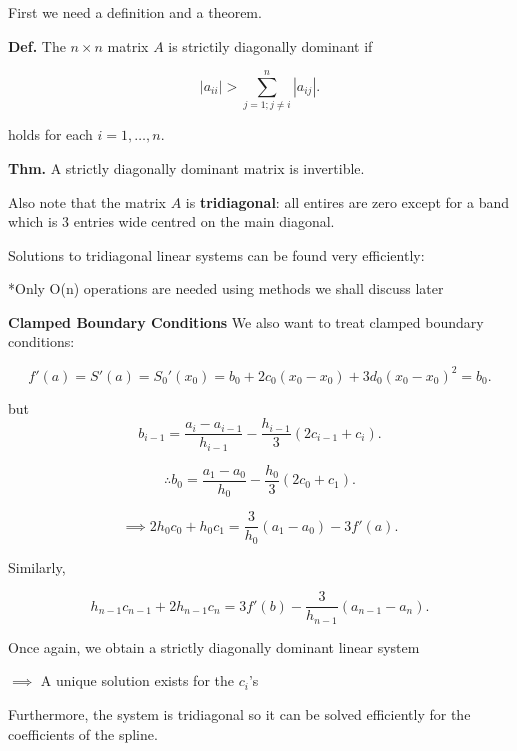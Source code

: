 \documentclass[12pt]{article}
\newcommand{\defn}{\textbf{Def.}\xspace}
\newcommand{\thm}{\textbf{Thm.}\xspace}
\begin{document}
First we need a definition and a theorem.

\defn The $n \times n$ matrix $A$ is strictily diagonally dominant if 

\[
  |a_{ii}| > \sum_{j=1; j\neq i}^{n} |a_{ij}|
.\]

holds for each $i = 1, \dots, n$.

\thm A strictly diagonally dominant matrix is invertible.

Also note that the matrix $A$ is \textbf{tridiagonal}: all entires are zero
except for a band which is 3 entries wide centred on the main diagonal.

Solutions to tridiagonal linear systems can be found very efficiently:

*Only O(n) operations are needed using methods we shall discuss later

\textbf{Clamped Boundary Conditions}
We also want to treat clamped boundary conditions:

\[
f'(a) = S'(a) = S_0'(x_0) = b_0 + 2c_0 (x_0-x_0) + 3d_0 (x_0-x_0)^2 = b_0
.\]

but 
\[
  b_{i-1} = \frac{a_i - a_{i-1}}{h_{i-1}} - \frac{h_{i-1}}{3}(2c_{i-1} + c_i)
.\]

\[
\therefore b_0 = \frac{a_1 - a_0}{h_0} - \frac{h_0}{3}(2c_0 + c_1)
.\]

\[
\implies 2h_0c_0 + h_0 c_1 = \frac{3}{h_0}(a_1 - a_0) - 3f'(a)
.\]

Similarly, 

\[
  h_{n-1} c_{n-1} + 2h_{n-1} c_n = 3f'(b) - \frac{3}{h_{n-1}}(a_{n-1} - a_n)
.\]

Once again, we obtain a strictly diagonally dominant linear system

\begin{center}
  $\implies$ A unique solution exists for the $c_i$'s
\end{center}

Furthermore, the system is tridiagonal so it can be solved efficiently for the
coefficients of the spline.
\end{document}
